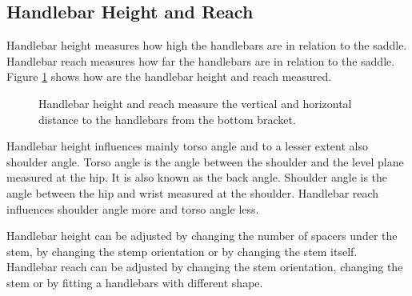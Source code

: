 \subsection{Handlebar Height and Reach}
Handlebar height measures how high the handlebars are in relation to the saddle. Handlebar reach measures how far the handlebars are in relation to the saddle. Figure \ref{fig:handlebar_height_and_reach} shows how are the handlebar height and reach measured.

\begin{figure}[htb]
    \centering
    \hfill
    \caption{Handlebar height and reach measure the vertical and horizontal distance to the handlebars from the bottom bracket.}
    \label{fig:handlebar_height_and_reach}
\end{figure}



Handlebar height influences mainly torso angle and to a lesser extent also shoulder angle. Torso angle is the angle between the shoulder and the level plane measured at the hip. It is also known as the back angle. Shoulder angle is the angle between the hip and wrist measured at the shoulder. Handlebar reach influences shoulder angle more and torso angle less.

Handlebar height can be adjusted by changing the number of spacers under the stem, by changing the stemp orientation or by changing the stem itself. Handlebar reach can be adjusted by changing the stem orientation, changing the stem or by fitting a handlebars with different shape.

